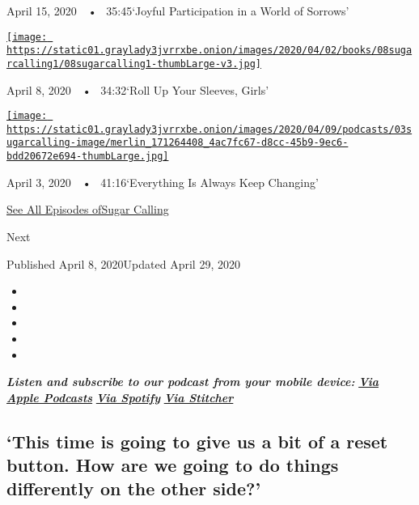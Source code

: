 April 15, 2020~~•~ 35:45`Joyful Participation in a World of Sorrows'

\href{https://www.nytimes3xbfgragh.onion/2020/04/08/podcasts/sugar-calling-margaret-atwood-coronavirus.html?action=click\&module=audio-series-bar\&region=header\&pgtype=Article}{\texttt{[image: https://static01.graylady3jvrrxbe.onion/images/2020/04/02/books/08sugarcalling1/08sugarcalling1-thumbLarge-v3.jpg]}}

April 8, 2020~~•~ 34:32`Roll Up Your Sleeves, Girls'

\href{https://www.nytimes3xbfgragh.onion/2020/04/03/podcasts/sugar-calling-george-saunders-coronavirus.html?action=click\&module=audio-series-bar\&region=header\&pgtype=Article}{\texttt{[image: https://static01.graylady3jvrrxbe.onion/images/2020/04/09/podcasts/03sugarcalling-image/merlin\_171264408\_4ac7fc67-d8cc-45b9-9ec6-bdd20672e694-thumbLarge.jpg]}}

April 3, 2020~~•~ 41:16`Everything Is Always Keep Changing'

\href{https://www.nytimes3xbfgragh.onion/column/sugar-calling}{See All
Episodes ofSugar Calling}

Next

Published April 8, 2020Updated April 29, 2020

\begin{itemize}
\item
\item
\item
\item
\item
\end{itemize}

\emph{\textbf{Listen and subscribe to our podcast from your mobile
device:}}
\textbf{\href{https://podcasts.apple.com/us/podcast/sugar-calling/id1505881384}{\emph{Via
Apple Podcasts}}} \emph{\textbf{\textbar{}}}
\textbf{\href{https://open.spotify.com/show/4U8hPiNGIBvTS9zLeiDCN7?si=gRyigD47SPWl-QWgNjgt2w}{\emph{Via
Spotify}}} \emph{\textbf{\textbar{}}}
\textbf{\href{https://www.stitcher.com/podcast/the-new-york-times/sugar-calling}{\emph{Via
Stitcher}}}

\hypertarget{this-time-is-going-to-give-us-a-bit-of-a-reset-button-how-are-we-going-to-do-things-differently-on-the-other-side}{%
\subsection{`This time is going to give us a bit of a reset button. How
are we going to do things differently on the other
side?'}\label{this-time-is-going-to-give-us-a-bit-of-a-reset-button-how-are-we-going-to-do-things-differently-on-the-other-side}}

